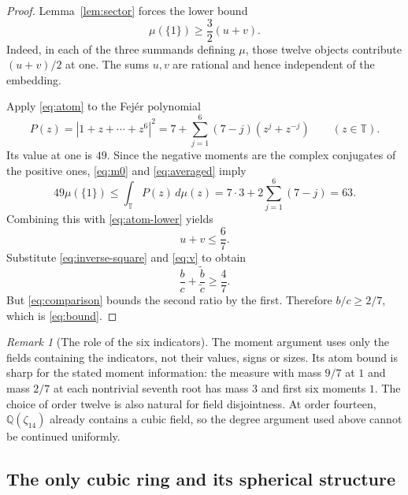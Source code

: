 \documentclass[11pt,a4paper]{article}
\theoremstyle{definition}
\theoremstyle{remark}
\newtheorem{remark}[theorem]{Remark}
\newcommand{\Q}{\mathbb Q}
\newcommand{\T}{\mathbb T}
\numberwithin{equation}{section}
\begin{document}
\begin{proof}
Lemma~\ref{lem:sector} forces the lower bound
\begin{equation}\label{eq:atom-lower}
 \mu(\{1\})\geq\frac32(u+v).
\end{equation}
Indeed, in each of the three summands defining $\mu$, those twelve objects contribute $(u+v)/2$ at one. The sums $u,v$ are rational and hence independent of the embedding.

Apply \eqref{eq:atom} to the Fejér polynomial
\[
 P(z)=|1+z+\cdots+z^6|^2
     =7+\sum_{j=1}^6(7-j)(z^j+z^{-j})\qquad(z\in\T).
\]
Its value at one is $49$. Since the negative moments are the complex conjugates of the positive ones, \eqref{eq:m0} and \eqref{eq:averaged} imply
\[
 49\mu(\{1\})\leq\int_{\T}P(z)\,d\mu(z)
   =7\cdot3+2\sum_{j=1}^6(7-j)=63.
\]
Combining this with \eqref{eq:atom-lower} yields
\[
 u+v\leq\frac67.
\]
Substitute \eqref{eq:inverse-square} and \eqref{eq:v} to obtain
\begin{equation}\label{eq:two-ratios}
 \frac bc+\frac{\widetilde b}{\widetilde c}\geq\frac47.
\end{equation}
But \eqref{eq:comparison} bounds the second ratio by the first. Therefore $b/c\geq2/7$, which is \eqref{eq:bound}.
\end{proof}

\begin{remark}[The role of the six indicators]\label{rem:six}
The moment argument uses only the fields containing the indicators, not their values, signs or sizes. Its atom bound is sharp for the stated moment information: the measure with mass $9/7$ at $1$ and mass $2/7$ at each nontrivial seventh root has mass $3$ and first six moments $1$. The choice of order twelve is also natural for field disjointness. At order fourteen, $\Q(\zeta_{14})$ already contains a cubic field, so the degree argument used above cannot be continued uniformly.
\end{remark}

\subsection{The only cubic ring and its spherical structure}
\end{document}
